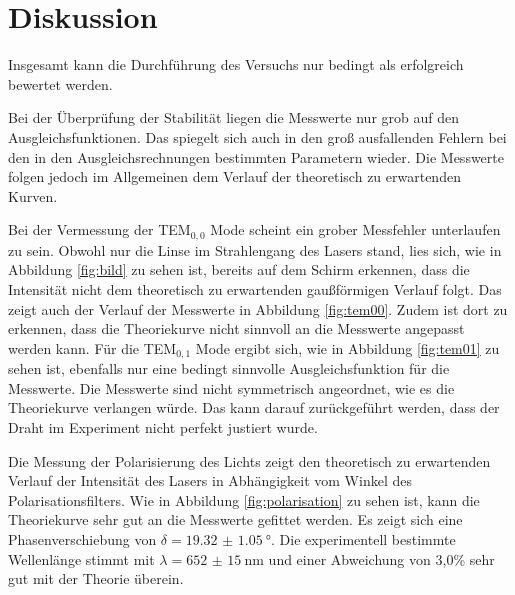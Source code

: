\section{Diskussion}
\label{sec:Diskussion}
Insgesamt kann die Durchführung des Versuchs nur bedingt als erfolgreich
bewertet werden.

Bei der Überprüfung der Stabilität liegen die Messwerte nur grob auf den
Ausgleichsfunktionen. Das spiegelt sich auch in den groß ausfallenden Fehlern bei
den in den Ausgleichsrechnungen bestimmten Parametern wieder. Die Messwerte folgen
jedoch im Allgemeinen dem Verlauf der theoretisch zu erwartenden Kurven.

Bei der Vermessung der TEM$_{\mathrm{0,0}}$ Mode scheint ein grober Messfehler
unterlaufen zu sein. Obwohl nur die Linse im Strahlengang des Lasers
stand, lies sich, wie in Abbildung \ref{fig:bild} zu sehen ist, bereits auf dem
Schirm erkennen, dass die Intensität nicht dem theoretisch zu erwartenden gaußförmigen
Verlauf folgt. Das zeigt auch der Verlauf der Messwerte in Abbildung \ref{fig:tem00}.
Zudem ist dort zu erkennen, dass die Theoriekurve nicht sinnvoll an die Messwerte
angepasst werden kann.
Für die TEM$_{\mathrm{0,1}}$ Mode ergibt sich, wie in Abbildung \ref{fig:tem01} zu
sehen ist, ebenfalls nur eine bedingt sinnvolle Ausgleichsfunktion für die Messwerte.
Die Messwerte sind nicht symmetrisch angeordnet, wie es die Theoriekurve verlangen würde.
Das kann darauf zurückgeführt werden, dass der Draht im Experiment nicht perfekt
justiert wurde.

Die Messung der Polarisierung des Lichts zeigt den theoretisch zu erwartenden Verlauf
der Intensität des Lasers in Abhängigkeit vom Winkel des Polarisationsfilters. Wie
in Abbildung \ref{fig:polarisation} zu sehen ist, kann die Theoriekurve sehr gut an
die Messwerte gefittet werden. Es zeigt sich eine Phasenverschiebung von $\delta=\SI{19.32(105)}{\degree}$.
Die experimentell bestimmte Wellenlänge stimmt mit $\lambda=\SI{652(15)}{\nano\metre}$
und einer Abweichung von 3{,}0\% sehr gut mit der Theorie überein.
